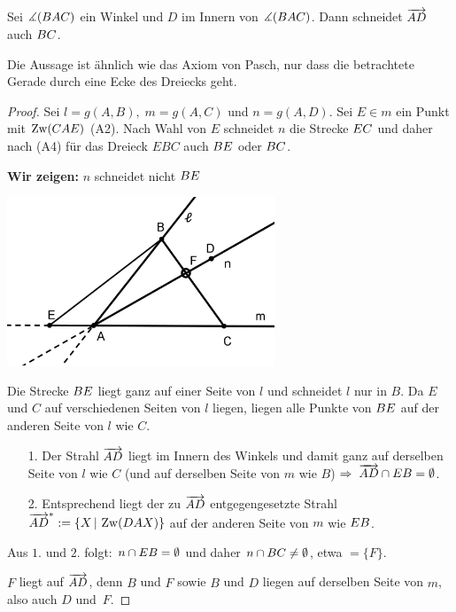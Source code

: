 


\begin{thm}\label{thm:satz.s1c}
Sei $\mbox{$\measuredangle$}(BAC)$ ein Winkel und $D$ im Innern von $\mbox{$\measuredangle$}(BAC)$. Dann schneidet
$\mbox{${\overrightarrow{AD}}$}$ auch ${BC}$.
\end{thm}


Die Aussage ist \"{a}hnlich wie das Axiom von Pasch, nur dass die
betrachtete Gerade durch eine Ecke des Dreiecks geht.\\


\begin {proof}
Sei $l=g(A,B),\;m=g(A,C)$ und $n=g(A,D)$. Sei $E\in m$
ein Punkt mit $\operatorname{Zw}(CAE)$ (A2). Nach Wahl von $E$ schneidet $n$ die
Strecke ${EC}$ und daher nach (A4) f\"{u}r das Dreieck $EBC$
auch ${BE}$ oder ${BC}$.

{\bf Wir zeigen:} $n$ schneidet nicht ${BE}$


\centerline{\includegraphics[width=8cm]{BILDER/1-1-09-Satz.png}}


Die Strecke ${BE}$ liegt ganz auf einer Seite von $l$ und
schneidet $l$ nur in $B$. Da $E$ und $C$ auf verschiedenen Seiten
von $l$ liegen, liegen alle Punkte von ${BE}$ auf der anderen
Seite von $l$ wie $C$.
\begin{enumerate}
    \item[1.] Der Strahl $\mbox{${\overrightarrow{AD}}$}$ liegt im Innern des Winkels und
    damit ganz auf derselben Seite von $l$ wie $C$ (und auf
    derselben Seite von $m$ wie $B$) $\Rightarrow\;
    \mbox{${\overrightarrow{AD}}$}\cap{EB}=\emptyset$.
    \item[2.] Entsprechend liegt der zu $\mbox{${\overrightarrow{AD}}$}$ entgegengesetzte
    Strahl $\mbox{${\overrightarrow{AD}}$}^*:=\{X\,|\,\operatorname{Zw}(DAX)\}$ auf der anderen Seite von $m$ wie ${EB}$.
\end{enumerate}
Aus $1.$ und $2.$ folgt: $n\cap{EB}=\emptyset$ und daher
$n\cap{BC}\neq\emptyset$, etwa $=\{F\}$.

$F$ liegt auf $\mbox{${\overrightarrow{AD}}$}$, denn $B$ und $F$ sowie $B$ und $D$ liegen
auf derselben Seite von $m$, also auch $D$ und~$F$.
\end{proof}





